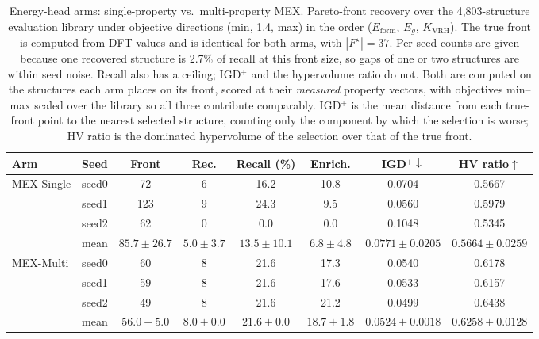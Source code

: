 \begin{table}[htbp]
\renewcommand{\arraystretch}{1.2}
\setlength{\tabcolsep}{4pt}
\caption{Energy-head arms: single-property vs.\ multi-property MEX. Pareto-front recovery over the 4{,}803-structure evaluation library under objective directions (min, 1.4, max) in the order ($E_\mathrm{form}$, $E_g$, $K_\mathrm{VRH}$). The true front is computed from DFT values and is identical for both arms, with $|F^\star|{=}37$. Per-seed counts are given because one recovered structure is 2.7\% of recall at this front size, so gaps of one or two structures are within seed noise. Recall also has a ceiling; IGD$^+$ and the hypervolume ratio do not. Both are computed on the structures each arm places on its front, scored at their \emph{measured} property vectors, with objectives min--max scaled over the library so all three contribute comparably. IGD$^+$ is the mean distance from each true-front point to the nearest selected structure, counting only the component by which the selection is worse; HV ratio is the dominated hypervolume of the selection over that of the true front.}
\label{tab:pareto_arms_mex_heldout_min_1_4_max}
\centering
\footnotesize
\begin{tabular}{@{}llcccccc@{}}
\hline\hline
\textbf{Arm} & \textbf{Seed} & \textbf{Front} & \textbf{Rec.} & \textbf{Recall (\%)} & \textbf{Enrich.} & \textbf{IGD$^+\downarrow$} & \textbf{HV ratio$\uparrow$} \\
\hline
\multirow{4}{*}{MEX-Single}
  & seed0 & 72 & 6 & 16.2 & 10.8 & 0.0704 & 0.5667 \\
  & seed1 & 123 & 9 & 24.3 & 9.5 & 0.0560 & 0.5979 \\
  & seed2 & 62 & 0 & 0.0 & 0.0 & 0.1048 & 0.5345 \\
  & mean & $85.7 \pm 26.7$ & $5.0 \pm 3.7$ & $13.5 \pm 10.1$ & $6.8 \pm 4.8$ & $0.0771 \pm 0.0205$ & $0.5664 \pm 0.0259$ \\
\hline
\multirow{4}{*}{MEX-Multi}
  & seed0 & 60 & 8 & 21.6 & 17.3 & 0.0540 & 0.6178 \\
  & seed1 & 59 & 8 & 21.6 & 17.6 & 0.0533 & 0.6157 \\
  & seed2 & 49 & 8 & 21.6 & 21.2 & 0.0499 & 0.6438 \\
  & mean & $56.0 \pm 5.0$ & $8.0 \pm 0.0$ & $21.6 \pm 0.0$ & $18.7 \pm 1.8$ & $0.0524 \pm 0.0018$ & $0.6258 \pm 0.0128$ \\
\hline\hline
\end{tabular}
\end{table}
